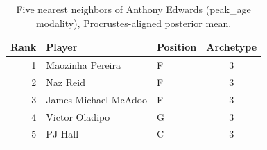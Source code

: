 \begin{table}[htbp]
  \centering\small
  \begin{tabular}{rllc}
    \toprule
    Rank & Player & Position & Archetype \\
    \midrule
    1 & Maozinha Pereira & F & 3 \\
    2 & Naz Reid & F & 3 \\
    3 & James Michael McAdoo & F & 3 \\
    4 & Victor Oladipo & G & 3 \\
    5 & PJ Hall & C & 3 \\
    \bottomrule
  \end{tabular}
  \caption{Five nearest neighbors of Anthony Edwards (peak_age modality), Procrustes-aligned posterior mean.}
  \label{tab:Anthony_Edwards_neighbors_peak_age}
\end{table}

